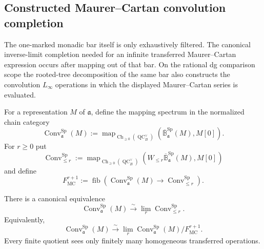 \subsection{Constructed Maurer--Cartan convolution completion}

The one-marked monadic bar itself is only exhaustively filtered.  The
canonical inverse-limit completion needed for an infinite transferred
Maurer--Cartan expression occurs after mapping out of that bar.  On the
rational dg comparison scope the rooted-tree decomposition of the same bar
also constructs the convolution $L_\infty$ operations in which the displayed
Maurer--Cartan series is evaluated.

\begin{definition}
\label{def:as-mc-convolution}
For a representation $M$ of $\mathfrak a$, define the mapping spectrum in
the normalized chain category
\[
\boxed{
    \operatorname{Conv}^{\mathrm{Sp}}_{\mathfrak a}(M)
    :=
    \operatorname{map}_{
        \operatorname{Ch}_{\geq0}(\operatorname{QC}^{\vee}_B)}
    \left(
        \overline{\mathbb B}^{\mathrm{Sp}}_{\mathfrak a}(M),
        M[0]
    \right).
}
\]
For $r\geq0$ put
\[
    \operatorname{Conv}_{\le r}^{\mathrm{Sp}}
    :=
    \operatorname{map}_{
        \operatorname{Ch}_{\geq0}(\operatorname{QC}^{\vee}_B)}
    \left(
        W_{\le r}
        \overline{\mathbb B}^{\mathrm{Sp}}_{\mathfrak a}(M),
        M[0]
    \right)
\]
and define
\[
\boxed{
    F_{\mathrm{MC}}^{r+1}
    :=
    \operatorname{fib}
    \left(
        \operatorname{Conv}^{\mathrm{Sp}}_{\mathfrak a}(M)
        \longrightarrow
        \operatorname{Conv}_{\le r}^{\mathrm{Sp}}
    \right).
}
\]
\end{definition}

\begin{proposition}
\label{prop:as-mc-weight-complete}
There is a canonical equivalence
\[
\boxed{
    \operatorname{Conv}^{\mathrm{Sp}}_{\mathfrak a}(M)
    \xrightarrow{\sim}
    \lim_r
    \operatorname{Conv}_{\le r}^{\mathrm{Sp}}.
}
\]
Equivalently,
\[
\boxed{
    \operatorname{Conv}^{\mathrm{Sp}}_{\mathfrak a}(M)
    \xrightarrow{\sim}
    \lim_r
    \operatorname{Conv}^{\mathrm{Sp}}_{\mathfrak a}(M)/
    F_{\mathrm{MC}}^{r+1}.
}
\]
Every finite quotient sees only finitely many homogeneous transferred
operations.
\end{proposition}

